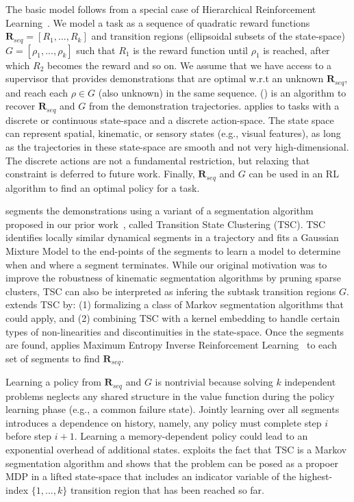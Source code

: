 The basic model follows from a special case of Hierarchical Reinforcement Learning~\cite{suttonPS99}.
We model a task as a sequence of quadratic reward functions $\mathbf{R}_{seq}=[R_1,...,R_k]$ and transition regions (ellipsoidal subsets of the state-space) $G = [\rho_1, ...,\rho_k]$ such that $R_1$ is the reward function until $\rho_1$ is reached, after which $R_2$ becomes the reward and so on.
We assume that we have access to a supervisor that provides demonstrations that are optimal w.r.t an unknown $\mathbf{R}_{seq}$, and reach each $\rho \in G$ (also unknown) in the same sequence. 
\hirlfull (\hirl) is an algorithm to recover $\mathbf{R}_{seq}$ and $G$ from the demonstration trajectories.
\hirl applies to tasks with a discrete or continuous state-space and a discrete action-space.
The state space can represent spatial, kinematic, or sensory states (e.g., visual features), as long as the trajectories in these state-space are smooth and not very high-dimensional.
The discrete actions are not a fundamental restriction, but relaxing that constraint is deferred to future work.
Finally, $\mathbf{R}_{seq}$ and $G$ can be used in an RL algorithm to find an optimal policy for a task.

\hirl segments the demonstrations using a variant of a segmentation algorithm proposed in our prior work~\cite{krishnan2015tsc,murali2016}, called Transition State Clustering (TSC).
TSC identifies locally similar dynamical segments in a trajectory and fits a Gaussian Mixture Model to the end-points of the segments to learn a model to determine when and where a segment terminates.
While our original motivation was to improve the robustness of kinematic segmentation algorithms by pruning sparse clusters, TSC can also be interpreted as infering the subtask transition regions $G$.
\hirl extends TSC by: (1) formalizing a class of Markov segmentation algorithms that could apply, and (2) combining TSC with a kernel embedding to handle certain types of non-linearities and discontinuities in the state-space.
Once the segments are found, \hirl applies Maximum Entropy Inverse Reinforcement Learning~\cite{DBLP:conf/aaai/ZiebartMBD08} to each set of segments to find $\mathbf{R}_{seq}$.

Learning a policy from $\mathbf{R}_{seq}$ and $G$ is nontrivial because solving $k$ independent problems neglects any shared structure in the value function during the policy learning phase (e.g., a common failure state).
Jointly learning over all segments introduces a dependence on history, namely, any policy must complete step $i$ before step $i+1$.
Learning a memory-dependent policy could lead to an exponential overhead of additional states. 
\hirl exploits the fact that TSC is a Markov segmentation algorithm and shows that the problem can be posed as a propoer MDP in a lifted state-space that includes an indicator variable of the highest-index $\{1,...,k\}$ transition region that has been reached so far.

